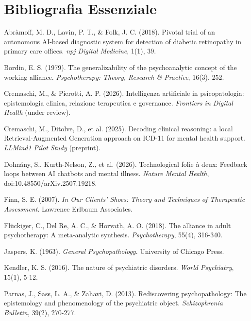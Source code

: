 \documentclass[11pt,a4paper]{article}
\begin{document}
\section{Bibliografia Essenziale}

\begin{enumerate}[label={[\arabic*]}]
    \item Abràmoff, M. D., Lavin, P. T., \& Folk, J. C. (2018). Pivotal trial of an autonomous AI-based diagnostic system for detection of diabetic retinopathy in primary care offices. \textit{npj Digital Medicine}, 1(1), 39.
    \item Bordin, E. S. (1979). The generalizability of the psychoanalytic concept of the working alliance. \textit{Psychotherapy: Theory, Research \& Practice}, 16(3), 252.
    \item Cremaschi, M., \& Pierotti, A. P. (2026). Intelligenza artificiale in psicopatologia: epistemologia clinica, relazione terapeutica e governance. \textit{Frontiers in Digital Health} (under review).
    \item Cremaschi, M., Ditolve, D., et al. (2025). Decoding clinical reasoning: a local Retrieval-Augmented Generation approach on ICD-11 for mental health support. \textit{LLMind1 Pilot Study} (preprint).
    \item Dohnány, S., Kurth-Nelson, Z., et al. (2026). Technological folie à deux: Feedback loops between AI chatbots and mental illness. \textit{Nature Mental Health}, doi:10.48550/arXiv.2507.19218.
    \item Finn, S. E. (2007). \textit{In Our Clients' Shoes: Theory and Techniques of Therapeutic Assessment}. Lawrence Erlbaum Associates.
    \item Flückiger, C., Del Re, A. C., \& Horvath, A. O. (2018). The alliance in adult psychotherapy: A meta-analytic synthesis. \textit{Psychotherapy}, 55(4), 316-340.
    \item Jaspers, K. (1963). \textit{General Psychopathology}. University of Chicago Press.
    \item Kendler, K. S. (2016). The nature of psychiatric disorders. \textit{World Psychiatry}, 15(1), 5-12.
    \item Parnas, J., Sass, L. A., \& Zahavi, D. (2013). Rediscovering psychopathology: The epistemology and phenomenology of the psychiatric object. \textit{Schizophrenia Bulletin}, 39(2), 270-277.

\end{enumerate}
\end{document}
